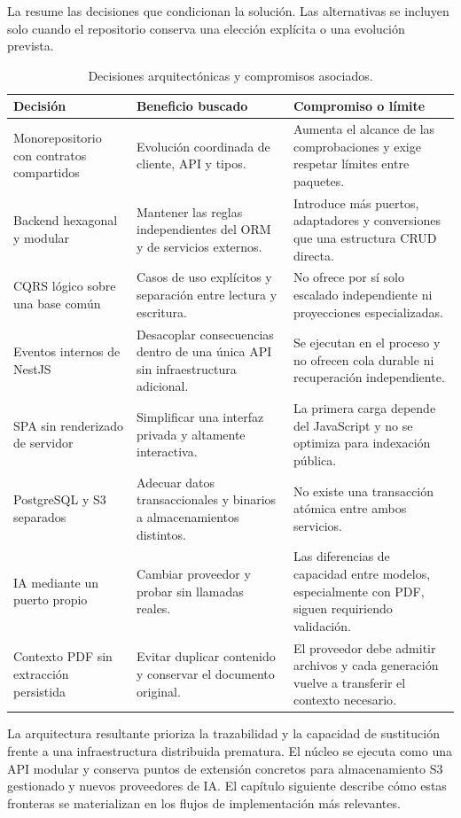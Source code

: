 La  resume las decisiones que condicionan la
solución. Las alternativas se incluyen solo cuando el repositorio conserva una
elección explícita o una evolución prevista.

\begin{table}[htbp]
  \centering
  \caption{Decisiones arquitectónicas y compromisos asociados.}
  \label{tab:architecture-decisions}
  \begin{tabular}{L{0.23\textwidth} L{0.32\textwidth} L{0.36\textwidth}}
    \toprule
    \textbf{Decisión} & \textbf{Beneficio buscado} & \textbf{Compromiso o límite} \\
    \midrule
    Monorepositorio con contratos compartidos & Evolución coordinada de cliente, API y tipos. & Aumenta el alcance de las comprobaciones y exige respetar límites entre paquetes. \\
    Backend hexagonal y modular & Mantener las reglas independientes del ORM y de servicios externos. & Introduce más puertos, adaptadores y conversiones que una estructura CRUD directa. \\
    CQRS lógico sobre una base común & Casos de uso explícitos y separación entre lectura y escritura. & No ofrece por sí solo escalado independiente ni proyecciones especializadas. \\
    Eventos internos de NestJS & Desacoplar consecuencias dentro de una única API sin infraestructura adicional. & Se ejecutan en el proceso y no ofrecen cola durable ni recuperación independiente. \\
    SPA sin renderizado de servidor & Simplificar una interfaz privada y altamente interactiva. & La primera carga depende del JavaScript y no se optimiza para indexación pública. \\
    PostgreSQL y S3 separados & Adecuar datos transaccionales y binarios a almacenamientos distintos. & No existe una transacción atómica entre ambos servicios. \\
    IA mediante un puerto propio & Cambiar proveedor y probar sin llamadas reales. & Las diferencias de capacidad entre modelos, especialmente con PDF, siguen requiriendo validación. \\
    Contexto PDF sin extracción persistida & Evitar duplicar contenido y conservar el documento original. & El proveedor debe admitir archivos y cada generación vuelve a transferir el contexto necesario. \\
    \bottomrule
  \end{tabular}
\end{table}

La arquitectura resultante prioriza la trazabilidad y la capacidad de
sustitución frente a una infraestructura distribuida prematura. El núcleo se
ejecuta como una API modular y conserva puntos de extensión concretos para
almacenamiento S3 gestionado y nuevos proveedores de IA.
El capítulo siguiente describe cómo estas fronteras se materializan en los
flujos de implementación más relevantes.
